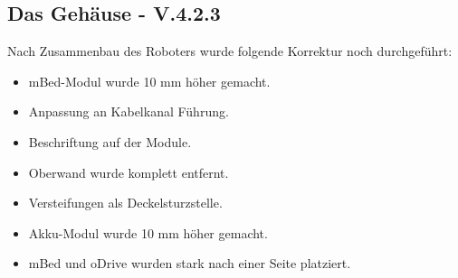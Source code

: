 \subsection{Das Gehäuse - V.4.2.3}

Nach Zusammenbau des Roboters wurde folgende Korrektur noch durchgeführt:
 
\begin{itemize} 
	\item  mBed-Modul wurde 10 mm höher gemacht.
	\item  Anpassung an Kabelkanal Führung.
	\item  Beschriftung auf der Module.
	\item  Oberwand wurde komplett entfernt.
	\item  Versteifungen als Deckelsturzstelle.
	\item  Akku-Modul wurde 10 mm höher gemacht.
	\item  mBed und oDrive wurden stark nach einer Seite platziert.
\end{itemize}

